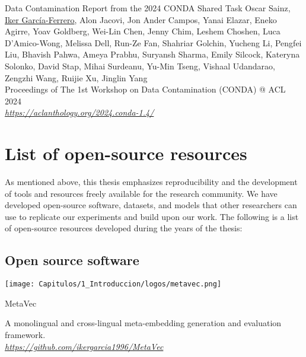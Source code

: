 \begin{not_part_of_the_thesis}{	
    Data Contamination Report from the 2024 CONDA Shared Task}
    Oscar Sainz, \underline{Iker García-Ferrero}, Alon Jacovi, Jon Ander Campos, Yanai Elazar, Eneko Agirre, Yoav Goldberg, Wei-Lin Chen, Jenny Chim, Leshem Choshen, Luca D'Amico-Wong, Melissa Dell, Run-Ze Fan, Shahriar Golchin, Yucheng Li, Pengfei Liu, Bhavish Pahwa, Ameya Prabhu, Suryansh Sharma, Emily Silcock, Kateryna Solonko, David Stap, Mihai Surdeanu, Yu-Min Tseng, Vishaal Udandarao, Zengzhi Wang, Ruijie Xu, Jinglin Yang \\
    Proceedings of The 1st Workshop on Data Contamination (CONDA) @ ACL 2024  \\
    \textit{\href{https://aclanthology.org/2024.conda-1.4/}{https://aclanthology.org/2024.conda-1.4/}}
\end{not_part_of_the_thesis}

\clearpage

\section{List of open-source resources}

As mentioned above, this thesis emphasizes reproducibility and the development of tools and resources freely available for the research community. We have developed open-source software, datasets, and models that other researchers can use to replicate our experiments and build upon our work. The following is a list of open-source resources developed during the years of the thesis:

\subsection{Open source software}

\begin{resources}
    {
    \begin{adjustbox}{valign=c}
    \texttt{[image: Capitulos/1\_Introduccion/logos/metavec.png]}
    \end{adjustbox}
    \begin{adjustbox}{valign=c}
    MetaVec
    \end{adjustbox}
    }
    A monolingual and cross-lingual meta-embedding generation and evaluation framework. \\
    \textit{\href{https://github.com/ikergarcia1996/MetaVec}{https://github.com/ikergarcia1996/MetaVec}}
\end{resources}


